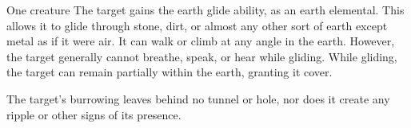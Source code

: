 \begin{spellheader}
    \spelldur{\durshort}
\end{spellheader}
\begin{spelleffects}
    \begin{spelltarget}{One creature}
        \spelleffect The target gains the earth glide ability, as an earth elemental. This allows it to glide through stone, dirt, or almost any other sort of earth except metal  as if it were air. It can walk or climb at any angle in the earth. However, the target generally cannot breathe, speak, or hear while gliding. While gliding, the target can remain partially within the earth, granting it cover.
    \end{spelltarget}
\end{spelleffects}
\begin{spellfooter}
    \spellnotes The target's burrowing leaves behind no tunnel or hole, nor does it create any ripple or other signs of its presence.
\end{spellfooter}

